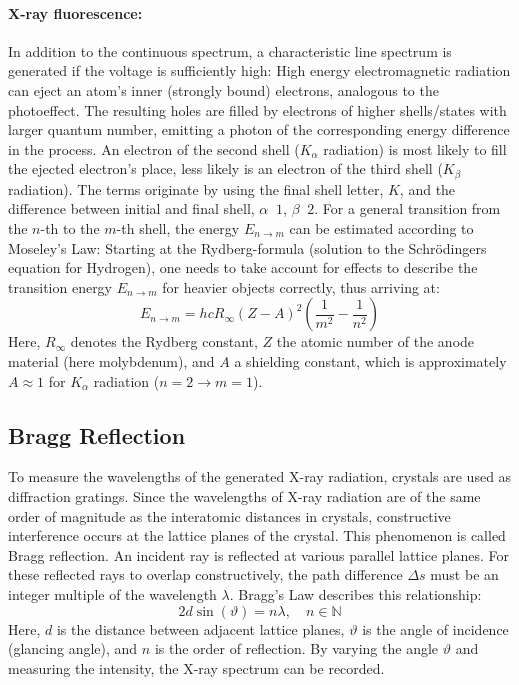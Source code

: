 \paragraph{X-ray fluorescence:}
In addition to the continuous spectrum, a characteristic line spectrum is generated if the voltage is sufficiently high: High energy electromagnetic radiation can eject an atom's inner (strongly bound) electrons, analogous to the photoeffect. The resulting holes are filled by electrons of higher shells/states with larger quantum number, emitting a photon of the corresponding energy difference in the process. An electron of the second shell (\(K_\alpha\) radiation) is most likely to fill the ejected electron's place, less likely is an electron of the third shell (\(K_\beta\) radiation). The terms originate by using the final shell letter, \(K\), and the difference between initial and final shell, \(\alpha\mathop{\hat{=}}1\), \(\beta\mathop{\hat{=}}2\).
For a general transition from the \(n\)-th to the \(m\)-th shell, the energy \(E_{n \to m}\) can be estimated according to Moseley's Law: 
Starting at the Rydberg-formula (solution to the Schrödingers equation for Hydrogen), one needs to take account for effects to describe the transition energy \(E_{n \to m}\) for heavier objects correctly, thus arriving at:
\begin{equation} \label{eq:mosley}
    E_{n \to m} = hc R_\infty (Z - A)^2 \left( \frac{1}{m^2} - \frac{1}{n^2} \right)
\end{equation}
Here, \(R_\infty\) denotes the Rydberg constant, \(Z\) the atomic number of the anode material (here molybdenum), and \(A\) a shielding constant, which is approximately \(A \approx 1\) for \(K_\alpha\) radiation (\(n=2 \to m=1\)).

\subsection{Bragg Reflection}
To measure the wavelengths of the generated X-ray radiation, crystals are used as diffraction gratings. Since the wavelengths of X-ray radiation are of the same order of magnitude as the interatomic distances in crystals, constructive interference occurs at the lattice planes of the crystal. This phenomenon is called Bragg reflection. An incident ray is reflected at various parallel lattice planes. For these reflected rays to overlap constructively, the path difference \(\Delta s\) must be an integer multiple of the wavelength \(\lambda\). Bragg's Law describes this relationship:
\begin{equation} \label{eq:bragg}
    2 d \sin(\vartheta) = n \lambda, \quad n \in \mathbb{N}
\end{equation}
Here, \(d\) is the distance between adjacent lattice planes, \(\vartheta\) is the angle of incidence (glancing angle), and \(n\) is the order of reflection. By varying the angle \(\vartheta\) and measuring the intensity, the X-ray spectrum can be recorded.
\FloatBarrier

